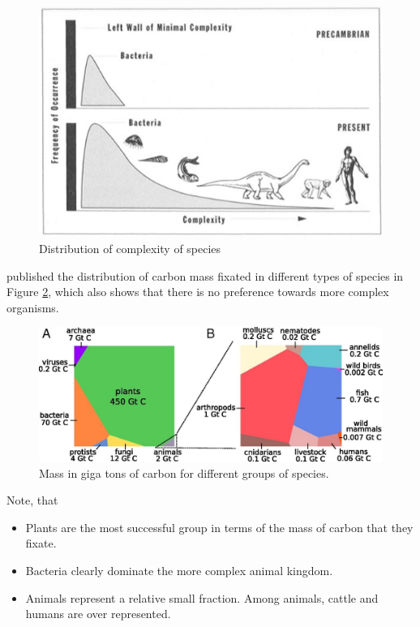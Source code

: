 \documentclass[
  11pt,
]{book}
\begin{document}
\begin{figure}

{\centering \includegraphics[width=0.45\linewidth]{./figs/selectionNoDirectionDef} 

}

\caption{Distribution of complexity of species \citep{gould1997}}\label{fig:distributionComplexity}
\end{figure}

\citet{Bar-On2018} published the distribution of carbon mass fixated in different types of species in Figure \ref{fig:carbonFixated}, which also shows that there is no preference towards more complex organisms.



\begin{figure}

{\centering \includegraphics[width=1\linewidth]{./figs/pnas.1711842115fig01} 

}

\caption{Mass in giga tons of carbon for different groups of species. \citep{Bar-On2018}}\label{fig:carbonFixated}
\end{figure}

Note, that

\begin{itemize}
\item
  Plants are the most successful group in terms of the mass of carbon that they fixate.
\item
  Bacteria clearly dominate the more complex animal kingdom.
\item
  Animals represent a relative small fraction. Among animals, cattle and humans are over represented.
\end{itemize}
\end{document}
